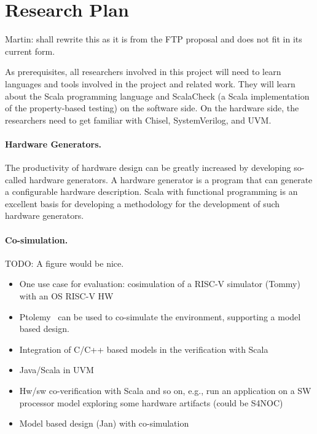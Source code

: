 \documentclass[conference]{IEEEtran}
\newcommand{\todo}[1]{{\color{olive} TODO: #1}}
\newcommand{\martin}[1]{{\color{blue} Martin: #1}}
\begin{document}
\section{Research Plan}

\martin{shall rewrite this as it is from the FTP proposal and does not
fit in its current form.}


As prerequisites, all researchers involved in this project will need to learn
languages and tools involved in the project and related work.
They will learn about the Scala programming language and ScalaCheck
(a Scala implementation of the property-based testing) on the software side.
On the hardware side,
the researchers need to get familiar with Chisel, SystemVerilog, and
UVM.


\paragraph{Hardware Generators.}

The productivity of hardware design can be greatly increased by developing so-called
hardware generators. A hardware generator is a program that can generate a configurable
hardware description.
Scala with functional programming is an excellent basis for developing a methodology for the
development of such hardware generators.



\paragraph{Co-simulation.}

\todo{A figure would be nice.}

\begin{itemize}
\item One use case for evaluation: cosimulation of a RISC-V simulator (Tommy) with an OS RISC-V HW 
\item Ptolemy~\cite{ptolemyII-book} can be used to co-simulate the environment, supporting a model based design.
\item Integration of C/C++ based models in the verification with Scala
\item Java/Scala in UVM
\item Hw/sw co-verification with Scala and so on, e.g., run an application on a SW processor model exploring some hardware artifacts (could be S4NOC)
\item Model based design (Jan) with co-simulation
\end{itemize}
\end{document}
